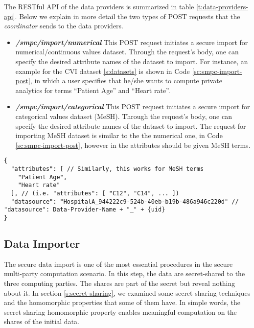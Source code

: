 The RESTful API of the data providers is summarized in table \ref{t:data-providers-api}.
Below we explain in more detail the two types of POST requests that the \textit{coordinator} sends to the data providers.

\begin{itemize}
\item \textbf{\textit{/smpc/import/numerical}}
This POST request initiates a secure import for numerical/continuous values dataset.
Through the request's body, one can specify the desired attribute names of the dataset to import.
For instance, an example for the CVI dataset \ref{s:datasets} is shown in Code \ref{sc:smpc-import-post}, in which a user specifies that he/she wants to compute private analytics for terms ``Patient Age'' and ``Heart rate''.

\item \textbf{\textit{/smpc/import/categorical}}
This POST request initiates a secure import for categorical values dataset (MeSH).
Through the request's body, one can specify the desired attribute names of the dataset to import.
The request for importing MeSH dataset is similar to the the numerical one, in Code \ref{sc:smpc-import-post}, however in the attributes should be given MeSH terms.

\end{itemize}

{
\begin{verbatim}
{
  "attributes": [ // Similarly, this works for MeSH terms
    "Patient Age",
    "Heart rate"
  ], // (i.e. "attributes": [ "C12", "C14", ... ])
  "datasource": "HospitalA_944222c9-524b-40eb-b19b-486a946c220d" // "datasource": Data-Provider-Name + "_" + {uid}
}
\end{verbatim}
\label{sc:smpc-import-post}
}



\subsection{Data Importer}\label{ss:data-providers-importer}
The secure data import is one of the most essential procedures in the secure multi-party computation scenario.
In this step, the data are secret-shared to the three computing parties.
The shares are part of the secret but reveal nothing about it.
In section \ref{s:secret-sharing}, we examined some secret sharing techniques and the homomorphic properties that some of them have.
In simple words, the secret sharing homomorphic property enables meaningful computation on the shares of the initial data.

